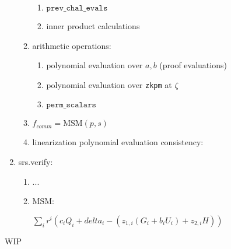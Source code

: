 \begin{enumerate}
\begin{enumerate}
\begin{enumerate}
			\item $\texttt{prev\_chal\_evals}$
			\item inner product calculations
		\end{enumerate}
		\item arithmetic operations:
		\begin{enumerate}
			\item polynomial evaluation over $a, b$ (proof evaluations)
			\item polynomial evaluation over \texttt{zkpm} at $\zeta$
			\item $\texttt{perm\_scalars}$
		\end{enumerate}
		\item $f_{comm} = \text{MSM}(p, s)$ %
		\item linearization polynomial evaluation consistency:  %
	\end{enumerate} 
	\item srs.verify: %
	\begin{enumerate}
		\item ...
		\item MSM:
		\begin{center}
			$\sum\limits_i r^i (c_i Q_i + delta_i - ( z_{1, i} (G_i + b_i U_i) + z_{2, i} H ))$
		\end{center}
	\end{enumerate}
\end{enumerate}

WIP